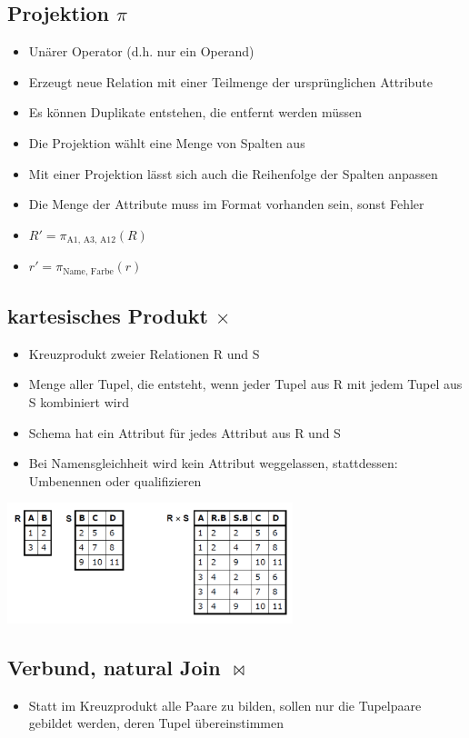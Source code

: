 \documentclass[8pt,a4paper]{scrartcl}
\begin{document}
\begin{multicols*}{3}
			\subsection{Projektion $\pi$}
				\begin{itemize}\itemsep0pt			
					\item Unärer Operator (d.h. nur ein Operand)
					\item Erzeugt neue Relation mit einer Teilmenge der ursprünglichen Attribute
					\item Es können Duplikate entstehen, die entfernt werden müssen
					\item Die Projektion wählt eine Menge von Spalten aus
					\item Mit einer Projektion lässt sich auch die Reihenfolge der Spalten anpassen
					\item Die Menge der Attribute muss im Format vorhanden sein, sonst Fehler
					\item $R' = \pi_{\text{A1, A3, A12}}(R)$
					\item $r' = \pi_{\text{Name, Farbe}}(r)$
				\end{itemize}
				
			\subsection{kartesisches Produkt $\times$}
				\begin{itemize}\itemsep0pt			
					\item Kreuzprodukt zweier Relationen R und S
					\item Menge aller Tupel, die entsteht, wenn jeder Tupel aus R mit jedem Tupel aus S kombiniert wird
					\item Schema hat ein Attribut für jedes Attribut aus R und S
					\item Bei Namensgleichheit wird kein Attribut weggelassen,
stattdessen: Umbenennen oder qualifizieren
				\end{itemize}

				\includegraphics[height=3.5cm]{img/kreuz.png}
				
			\subsection{Verbund, natural Join $\bowtie$}
				\begin{itemize}\itemsep0pt			
					\item Statt im Kreuzprodukt alle Paare zu bilden, sollen nur die Tupelpaare gebildet werden, deren Tupel übereinstimmen
				\end{itemize}


\end{multicols*}
\end{document}
